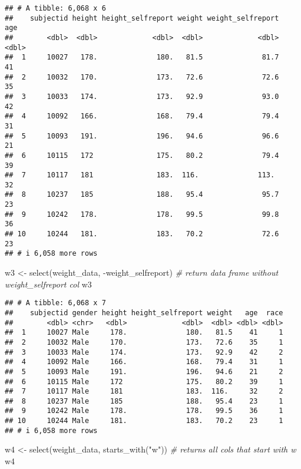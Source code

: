 \documentclass[
]{article}
\newenvironment{Shaded}{\begin{snugshade}}{\end{snugshade}}
\newcommand{\CommentTok}[1]{\textcolor[rgb]{0.56,0.35,0.01}{\textit{#1}}}
\newcommand{\FunctionTok}[1]{\textcolor[rgb]{0.00,0.00,0.00}{#1}}
\newcommand{\NormalTok}[1]{#1}
\newcommand{\OtherTok}[1]{\textcolor[rgb]{0.56,0.35,0.01}{#1}}
\newcommand{\SpecialCharTok}[1]{\textcolor[rgb]{0.00,0.00,0.00}{#1}}
\newcommand{\StringTok}[1]{\textcolor[rgb]{0.31,0.60,0.02}{#1}}
\begin{document}
\begin{verbatim}
## # A tibble: 6,068 x 6
##    subjectid height height_selfreport weight weight_selfreport   age
##        <dbl>  <dbl>             <dbl>  <dbl>             <dbl> <dbl>
##  1     10027   178.              180.   81.5              81.7    41
##  2     10032   170.              173.   72.6              72.6    35
##  3     10033   174.              173.   92.9              93.0    42
##  4     10092   166.              168.   79.4              79.4    31
##  5     10093   191.              196.   94.6              96.6    21
##  6     10115   172               175.   80.2              79.4    39
##  7     10117   181               183.  116.              113.     32
##  8     10237   185               188.   95.4              95.7    23
##  9     10242   178.              178.   99.5              99.8    36
## 10     10244   181.              183.   70.2              72.6    23
## # i 6,058 more rows
\end{verbatim}

\begin{Shaded}
\begin{Highlighting}[]
\NormalTok{w3 }\OtherTok{\textless{}{-}} \FunctionTok{select}\NormalTok{(weight\_data, }\SpecialCharTok{{-}}\NormalTok{weight\_selfreport) }\CommentTok{\# return data frame without weight\_selfreport col}
\NormalTok{w3}
\end{Highlighting}
\end{Shaded}

\begin{verbatim}
## # A tibble: 6,068 x 7
##    subjectid gender height height_selfreport weight   age  race
##        <dbl> <chr>   <dbl>             <dbl>  <dbl> <dbl> <dbl>
##  1     10027 Male     178.              180.   81.5    41     1
##  2     10032 Male     170.              173.   72.6    35     1
##  3     10033 Male     174.              173.   92.9    42     2
##  4     10092 Male     166.              168.   79.4    31     1
##  5     10093 Male     191.              196.   94.6    21     2
##  6     10115 Male     172               175.   80.2    39     1
##  7     10117 Male     181               183.  116.     32     2
##  8     10237 Male     185               188.   95.4    23     1
##  9     10242 Male     178.              178.   99.5    36     1
## 10     10244 Male     181.              183.   70.2    23     1
## # i 6,058 more rows
\end{verbatim}

\begin{Shaded}
\begin{Highlighting}[]
\NormalTok{w4 }\OtherTok{\textless{}{-}} \FunctionTok{select}\NormalTok{(weight\_data, }\FunctionTok{starts\_with}\NormalTok{(}\StringTok{"w"}\NormalTok{)) }\CommentTok{\# returns all cols that start with w}
\NormalTok{w4}
\end{Highlighting}
\end{Shaded}
\end{document}

